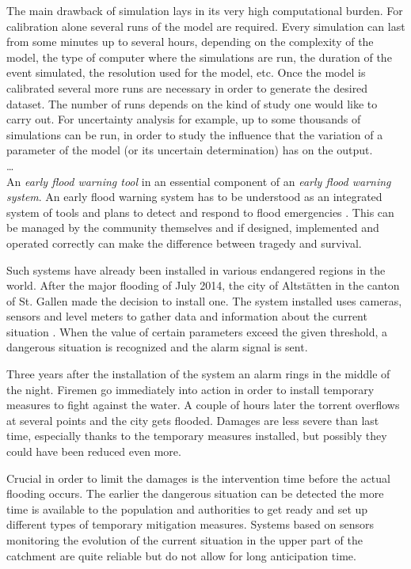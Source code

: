 The main drawback of simulation lays in its very high computational burden.
For calibration alone several runs of the model are required.
Every simulation can last from some minutes up to several hours, depending on the complexity of the model, the type of computer where the simulations are run, the duration of the event simulated, the resolution used for the model, etc.
Once the model is calibrated several more runs are necessary in order to generate the desired dataset.
The number of runs depends on the kind of study one would like to carry out.
For uncertainty analysis for example, up to some thousands of simulations can be run, in order to study the influence that the variation of a parameter of the model (or its uncertain determination) has on the output.\\

\ldots\\

An \textit{early flood warning tool} in an essential component of an \textit{early flood warning system}.
An early flood warning system has to be understood as an integrated system of tools and plans to detect and respond to flood emergencies \autocite{icimod_early_2018}.
This can be managed by the community themselves and if designed, implemented and operated correctly can make the difference between tragedy and survival.

Such systems have already been installed in various endangered regions in the world.
After the major flooding of July 2014, the city of Altstätten in the canton of St. Gallen made the decision to install one.
The system installed uses cameras, sensors and level meters to gather data and information about the current situation \autocite{st._galler_tageblatt_altstatten_2017}.
When the value of certain parameters exceed the given threshold, a dangerous situation is recognized and the alarm signal is sent.

Three years after the installation of the system an alarm rings in the middle of the night.
Firemen go immediately into action in order to install temporary measures to fight against the water.
A couple of hours later the torrent overflows at several points and the city gets flooded.
Damages are less severe than last time, especially thanks to the temporary measures installed, but possibly they could have been reduced even more.

Crucial in order to limit the damages is the intervention time before the actual flooding occurs.
The earlier the dangerous situation can be detected the more time is available to the population and authorities to get ready and set up different types of temporary mitigation measures.
Systems based on sensors monitoring the evolution of the current situation in the upper part of the catchment are quite reliable but do not allow for long anticipation time. 

